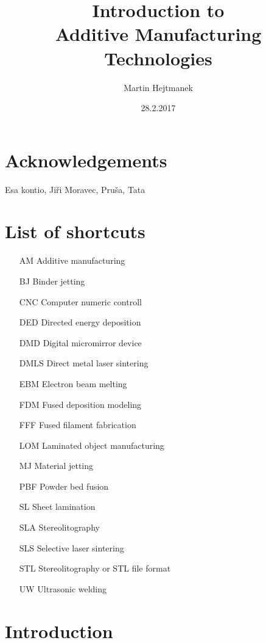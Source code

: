 \documentclass[a4paper, twoside, 11pt]{report}
\begin{document}
%
\begin{titlepage}
\title{Introduction to\\Additive Manufacturing Technologies}
\author{Martin Hejtmanek}
\date{28.2.2017}
\maketitle
\end{titlepage}
%
\chapter*{Acknowledgements}
Esa kontio, Jiři Moravec, Pruša, Tata

\tableofcontents

\chapter*{List of shortcuts}
\begin{itemize}
\item[AM]Additive manufacturing
\item[BJ]Binder jetting
\item[CNC]Computer numeric controll
\item[DED]Directed energy deposition
\item[DMD]Digital micromirror device
\item[DMLS]Direct metal laser sintering
\item[EBM]Electron beam melting
\item[FDM]Fused deposition modeling
\item[FFF]Fused filament fabrication
\item[LOM]Laminated object manufacturing
\item[MJ]Material jetting
\item[PBF]Powder bed fusion
\item[SL]Sheet lamination
\item[SLA]Stereolitography
\item[SLS]Selective laser sintering
\item[STL]Stereolitography or STL file format
\item[UW]Ultrasonic welding
\end{itemize}


\chapter{Introduction}
%
%
%
\end{document}
